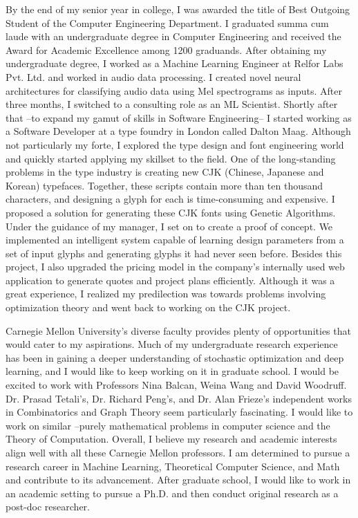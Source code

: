 \documentclass{article}
\begin{document}
By the end of my senior year in college, I was awarded the title of Best
Outgoing Student of the Computer Engineering Department. I graduated summa cum
laude with an undergraduate degree in Computer Engineering and received the
Award for Academic Excellence among 1200 graduands. After obtaining my
undergraduate degree, I worked as a Machine Learning Engineer at Relfor Labs
Pvt. Ltd. and worked in audio data processing. I created novel neural
architectures for classifying audio data using Mel spectrograms as inputs.
After three months, I switched to a consulting role as an ML Scientist. Shortly
after that --to expand my gamut of skills in Software Engineering-- I started
working as a Software Developer at a type foundry in London called Dalton Maag.
Although not particularly my forte, I explored the type design and font
engineering world and quickly started applying my skillset to the field. One of
the long-standing problems in the type industry is creating new CJK (Chinese,
Japanese and Korean) typefaces. Together, these scripts contain more than ten
thousand characters, and designing a glyph for each is time-consuming and
expensive. I proposed a solution for generating these CJK fonts using Genetic
Algorithms. Under the guidance of my manager, I set on to create a proof of
concept. We implemented an intelligent system capable of learning design
parameters from a set of input glyphs and generating glyphs it had never seen
before. Besides this project, I also upgraded the pricing model in the
company’s internally used web application to generate quotes and project plans
efficiently. Although it was a great experience, I realized my predilection was
towards problems involving optimization theory and went back to working on the
CJK project.  
\vspace{6pt}

Carnegie Mellon University's diverse faculty provides plenty of opportunities
that would cater to my aspirations. Much of my undergraduate research
experience has been in gaining a deeper understanding of stochastic
optimization and deep learning, and I would like to keep working on it in
graduate school. I would be excited to work with Professors Nina Balcan, Weina
Wang and David Woodruff. Dr. Prasad Tetali’s, Dr. Richard Peng’s, and Dr. Alan
Frieze’s independent works in Combinatorics and Graph Theory seem particularly
fascinating. I would like to work on similar --purely mathematical problems in
computer science and the Theory of Computation. Overall, I believe my research
and academic interests align well with all these Carnegie Mellon professors. I
am determined to pursue a research career in Machine Learning, Theoretical
Computer Science, and Math and contribute to its advancement. After graduate
school, I would like to work in an academic setting to pursue a Ph.D. and then
conduct original research as a post-doc researcher. 
\end{document}
